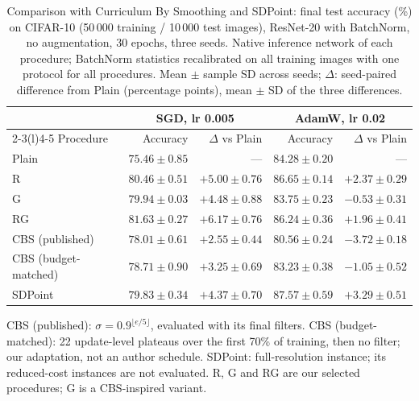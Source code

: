\begin{table}[!t]
\caption{Comparison with Curriculum By Smoothing and SDPoint: final test accuracy (\%) on CIFAR-10 (50\,000 training / 10\,000 test images), ResNet-20 with BatchNorm, no augmentation, 30 epochs, three seeds. Native inference network of each procedure; BatchNorm statistics recalibrated on all training images with one protocol for all procedures. Mean $\pm$ sample SD across seeds; $\Delta$: seed-paired difference from Plain (percentage points), mean $\pm$ SD of the three differences.}\label{tab:comparators}
\centering\small\setlength{\tabcolsep}{4pt}\renewcommand{\arraystretch}{1.08}
\begin{tabular*}{\linewidth}{@{\extracolsep{\fill}}lrrrr@{}}
\toprule
& \multicolumn{2}{c}{SGD, lr 0.005} & \multicolumn{2}{c}{AdamW, lr 0.02}\\
\cmidrule(lr){2-3}\cmidrule(l){4-5}
Procedure & Accuracy & $\Delta$ vs Plain & Accuracy & $\Delta$ vs Plain\\
\midrule
Plain & $75.46\pm0.85$ & --- & $84.28\pm0.20$ & ---\\
R & $80.46\pm0.51$ & $+5.00\pm0.76$ & $86.65\pm0.14$ & $+2.37\pm0.29$\\
G & $79.94\pm0.03$ & $+4.48\pm0.88$ & $83.75\pm0.23$ & $-0.53\pm0.31$\\
RG & $81.63\pm0.27$ & $+6.17\pm0.76$ & $86.24\pm0.36$ & $+1.96\pm0.41$\\
CBS (published) & $78.01\pm0.61$ & $+2.55\pm0.44$ & $80.56\pm0.24$ & $-3.72\pm0.18$\\
CBS (budget-matched) & $78.71\pm0.90$ & $+3.25\pm0.69$ & $83.23\pm0.38$ & $-1.05\pm0.52$\\
SDPoint & $79.83\pm0.34$ & $+4.37\pm0.70$ & $87.57\pm0.59$ & $+3.29\pm0.51$\\
\bottomrule
\end{tabular*}
\par\smallskip\begin{minipage}{\linewidth}\footnotesize CBS (published): $\sigma=0.9^{\lfloor e/5\rfloor}$, evaluated with its final filters. CBS (budget-matched): 22 update-level plateaus over the first 70\% of training, then no filter; our adaptation, not an author schedule. SDPoint: full-resolution instance; its reduced-cost instances are not evaluated. R, G and RG are our selected procedures; G is a CBS-inspired variant.\end{minipage}
\end{table}
